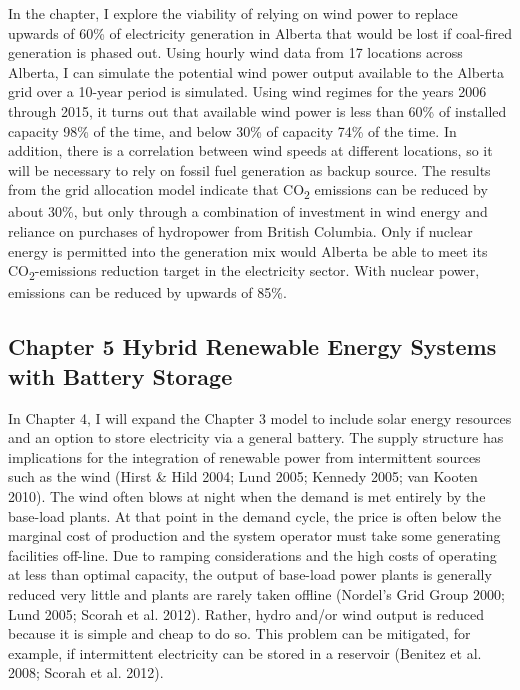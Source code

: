 In the chapter, I explore the viability of relying on wind power to
replace upwards of 60\% of electricity generation in Alberta that would
be lost if coal-fired generation is phased out. Using hourly wind data
from 17 locations across Alberta, I can simulate the potential wind
power output available to the Alberta grid over a 10-year period is
simulated. Using wind regimes for the years 2006 through 2015, it turns
out that available wind power is less than 60\% of installed capacity
98\% of the time, and below 30\% of capacity 74\% of the time. In
addition, there is a correlation between wind speeds at different
locations, so it will be necessary to rely on fossil fuel generation as
backup source. The results from the grid allocation model indicate that
CO\textsubscript{2} emissions can be reduced by about 30\%, but only
through a combination of investment in wind energy and reliance on
purchases of hydropower from British Columbia. Only if nuclear energy is
permitted into the generation mix would Alberta be able to meet its
CO\textsubscript{2}-emissions reduction target in the electricity
sector. With nuclear power, emissions can be reduced by upwards of 85\%.

\subsection{Chapter 5 Hybrid Renewable Energy Systems with Battery
Storage
}\label{chapter-5-hybrid-renewable-energy-systems-with-battery-storage}

In Chapter 4, I will expand the Chapter 3 model to include solar energy
resources and an option to store electricity via a general battery. The
supply structure has implications for the integration of renewable power
from intermittent sources such as the wind (Hirst \& Hild 2004; Lund
2005; Kennedy 2005; van Kooten 2010). The wind often blows at night when
the demand is met entirely by the base-load plants. At that point in the
demand cycle, the price is often below the marginal cost of production
and the system operator must take some generating facilities off-line.
Due to ramping considerations and the high costs of operating at less
than optimal capacity, the output of base-load power plants is generally
reduced very little and plants are rarely taken offline (Nordel's Grid
Group 2000; Lund 2005; Scorah et al. 2012). Rather, hydro and/or wind
output is reduced because it is simple and cheap to do so. This problem
can be mitigated, for example, if intermittent electricity can be stored
in a reservoir (Benitez et al. 2008; Scorah et al. 2012).

